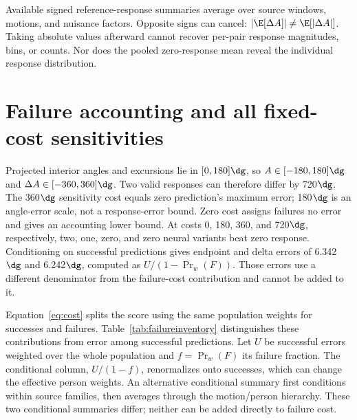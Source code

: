 \begin{table}[h]\centering\small
\caption{Response error ($\dg$) in all observation-by-nominal-edit groups, retaining the original 720$\dg$ failure cost. Clear/occluded describe image observations. The 15$\dg$ edit was excluded from fitting.}
\label{tab:levelinventory}
\setlength{\tabcolsep}{5pt}
\end{table}

\begin{table}[h]\centering\small
\caption{Response error ($\dg$) in all observation-by-estimator groups, with 2:1 seen/held nonzero-response weights. R: RTMPose-M; H: HRNet-W32; V: ViTPose-base. ViTPose was excluded from fitting. Original failure costs remain.}
\label{tab:extractorinventory}
\setlength{\tabcolsep}{3.7pt}
\end{table}

Available signed reference-response summaries average over source windows, motions, and nuisance factors. Opposite signs can cancel: $|\E[\Delta A]|\neq\E[|\Delta A|]$. Taking absolute values afterward cannot recover per-pair response magnitudes, bins, or counts. Nor does the pooled zero-response mean reveal the individual response distribution.

\clearpage
\section{Failure accounting and all fixed-cost sensitivities}
\label{app:cost}
Projected interior angles and excursions lie in $[0,180]\dg$, so $A\in[-180,180]\dg$ and $\Delta A\in[-360,360]\dg$. Two valid responses can therefore differ by 720$\dg$. The 360$\dg$ sensitivity cost equals zero prediction's maximum error; 180$\dg$ is an angle-error scale, not a response-error bound. Zero cost assigns failures no error and gives an accounting lower bound. At costs 0, 180, 360, and 720$\dg$, respectively, two, one, zero, and zero neural variants beat zero response. Conditioning on successful predictions gives endpoint and delta errors of 6.342$\dg$ and 6.242$\dg$, computed as $U/(1-\Pr_w(F))$. Those errors use a different denominator from the failure-cost contribution and cannot be added to it.

\label{app:failures}
Equation~\ref{eq:cost} splits the score using the same population weights for successes and failures. Table~\ref{tab:failureinventory} distinguishes these contributions from error among successful predictions. Let $U$ be successful errors weighted over the whole population and $f=\Pr_w(F)$ its failure fraction. The conditional column, $U/(1-f)$, renormalizes onto successes, which can change the effective person weights. An alternative conditional summary first conditions within source families, then averages through the motion/person hierarchy. These two conditional summaries differ; neither can be added directly to failure cost.

